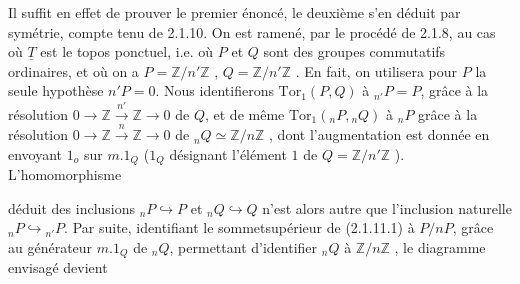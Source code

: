 Il suffit en effet de prouver le premier énoncé, le deuxième s'en déduit par symétrie, compte tenu de 2.1.10. On est ramené, par le procédé de 2.1.8, au cas où $\underline{T}$ est le topos ponctuel, i.e. où $P$ et $Q$ sont des groupes commutatifs ordinaires, et où on a $P = \mathbb{Z}/n'\mathbb{Z}$ , $Q = \mathbb{Z}/n'\mathbb{Z}$ . En fait, on utilisera pour $P$ la seule hypothèse $n'P=0$. Nous identifierons $\mathrm{Tor}_1(P,Q)$ à ${}_{n'}P = P$, grâce à la résolution $0 \longrightarrow \mathbb{Z} \overset{n'}{\longrightarrow} \mathbb{Z} \longrightarrow 0$ de $Q$, et de même $\mathrm{Tor}_1({}_{n}P,{}_{n}Q)$ à ${}_{n}P$ grâce à la résolution $0 \longrightarrow \mathbb{Z} \overset{n}{\longrightarrow} \mathbb{Z} \longrightarrow 0$ de ${}_{n}Q \simeq \mathbb{Z}/n\mathbb{Z}$ , dont l'augmentation est donnée en envoyant $1_o$ sur $m.1_Q$ ($1_Q$ désignant l'élément $1$ de $Q = \mathbb{Z}/n'\mathbb{Z}$ ). L'homomorphisme

\begin{center}
\end{center}

déduit des inclusions ${}_{n}P \hookrightarrow P$ et ${}_{n}Q \hookrightarrow Q$ n'est alors autre que l'inclusion naturelle ${}_{n}P \hookrightarrow {}_{n'}P$. Par suite, identifiant le sommetsupérieur de (2.1.11.1) à $P/nP$, grâce au générateur $m.1_Q$ de ${}_{n}Q$, permettant d'identifier ${}_{n}Q$ à $\mathbb{Z}/n\mathbb{Z}$ , le diagramme envisagé devient

